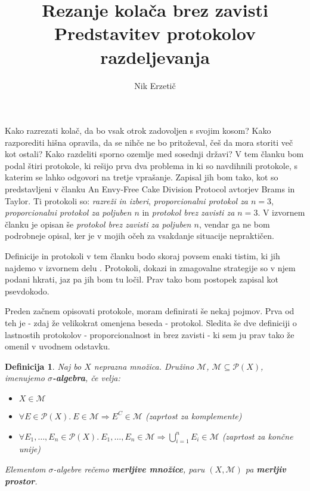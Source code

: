 \documentclass[a4paper, 12pt]{article}
\title{
	\textbf{Rezanje kolača brez zavisti} \\
	\large Predstavitev protokolov razdeljevanja 
}
\author{Nik Erzetič}
\newtheorem{definicija}{Definicija}
\begin{document}
	
	\maketitle
	
	Kako razrezati kolač, da bo vsak otrok zadovoljen s svojim kosom? Kako razporediti hišna opravila, da se nihče ne bo pritoževal, češ da mora storiti več kot ostali? Kako razdeliti sporno ozemlje med sosednji državi? V tem članku bom podal štiri protokole, ki rešijo prva dva problema in ki so navdihnili protokole, s katerim se lahko odgovori na tretje vprašanje. Zapisal jih bom tako, kot so predstavljeni v članku An Envy-Free Cake Division Protocol \cite{brams-taylor} avtorjev Brams in Taylor. Ti protokoli so: \textit{razreži in izberi}, \textit{proporcionalni protokol za $n = 3$}, \textit{proporcionalni protokol za poljuben $n$} in \textit{protokol brez zavisti za $n = 3$}. V izvornem članku je opisan še \textit{protokol brez zavisti za poljuben $n$}, vendar ga ne bom podrobneje opisal, ker je v mojih očeh za vsakdanje situacije nepraktičen.
	
	Definicije in protokoli v tem članku bodo skoraj povsem enaki tistim, ki jih najdemo v izvornem delu \cite{brams-taylor}. Protokoli, dokazi in zmagovalne strategije so v njem podani hkrati, jaz pa jih bom tu ločil. Prav tako bom postopek zapisal kot psevdokodo.
	
	Preden začnem opisovati protokole, moram definirati še nekaj pojmov. Prva od teh je - zdaj že velikokrat omenjena beseda - protokol. Sledita še dve definiciji o lastnostih protokolov - proporcionalnost in brez zavisti - ki sem ju prav tako že omenil v uvodnem odstavku.
	
	\begin{definicija}
		Naj bo $X$ neprazna množica. Družino $\mathcal{M}$, $\mathcal{M} \subseteq \mathcal{P}(X)$, imenujemo \textbf{$\sigma$-algebra}, če velja:
		\begin{itemize}
			\item $X \in \mathcal{M}$
			
			\item $\forall E \in \mathcal{P}(X).\ E \in \mathcal{M} \Rightarrow E^C \in \mathcal{M}$ (zaprtost za komplemente)
			
			\item $\forall E_1, \ldots, E_n \in \mathcal{P}(X).\ E_1, \ldots, E_n \in \mathcal{M} \Rightarrow \bigcup_{i=1}^{n} E_i \in \mathcal{M}$ (zaprtost za končne unije)
		\end{itemize}
		Elementom $\sigma$-algebre rečemo \textbf{merljive množice}, paru $(X, \mathcal{M})$ pa \textbf{merljiv prostor}.
	\end{definicija}
\end{document}
